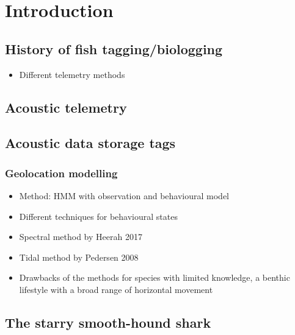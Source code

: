 \documentclass[
  authoryear,
  review,
  3p]{elsarticle}
\providecommand{\tightlist}{%
  \setlength{\itemsep}{0pt}\setlength{\parskip}{0pt}}\usepackage{longtable,booktabs,array}
\begin{document}
\newpage{}

\hypertarget{sec-intro}{%
\section{Introduction}\label{sec-intro}}

\hypertarget{history-of-fish-taggingbiologging}{%
\subsection{History of fish
tagging/biologging}\label{history-of-fish-taggingbiologging}}

\begin{itemize}
\tightlist
\item
  Different telemetry methods
\end{itemize}

\hypertarget{acoustic-telemetry}{%
\subsection{Acoustic telemetry}\label{acoustic-telemetry}}

\hypertarget{acoustic-data-storage-tags}{%
\subsection{Acoustic data storage
tags}\label{acoustic-data-storage-tags}}

\hypertarget{geolocation-modelling}{%
\subsubsection{Geolocation modelling}\label{geolocation-modelling}}

\begin{itemize}
\tightlist
\item
  Method: HMM with observation and behavioural model
\item
  Different techniques for behavioural states
\item
  Spectral method by Heerah 2017
\item
  Tidal method by Pedersen 2008
\item
  Drawbacks of the methods for species with limited knowledge, a benthic
  lifestyle with a broad range of horizontal movement
\end{itemize}

\hypertarget{the-starry-smooth-hound-shark}{%
\subsection{The starry smooth-hound
shark}\label{the-starry-smooth-hound-shark}}
\end{document}
